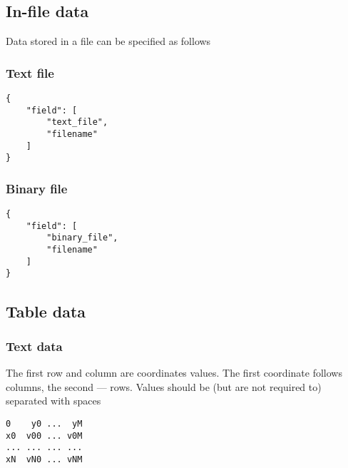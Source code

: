 \documentclass[12pt]{extarticle}
\begin{document}
        \subsection{\label{sec:in-file}In-file data}
            \par Data stored in a file can be specified as follows
            \subsubsection{Text file}
                \begin{verbatim}
{
    "field": [
        "text_file",
        "filename"
    ]
}
                \end{verbatim}
            \newpage
            \subsubsection{Binary file}
                \begin{verbatim}
{
    "field": [
        "binary_file",
        "filename"
    ]
}
                \end{verbatim}
        \subsection{Table data\label{sec:table_data}}
            \subsubsection{Text data}
                \par The first row and column are coordinates values. The first coordinate follows columns, the second --- rows. Values should be (but are not required to) separated with spaces
                \begin{verbatim}
0    y0 ...  yM
x0  v00 ... v0M
... ... ... ...
xN  vN0 ... vNM
                \end{verbatim}
\end{document}
